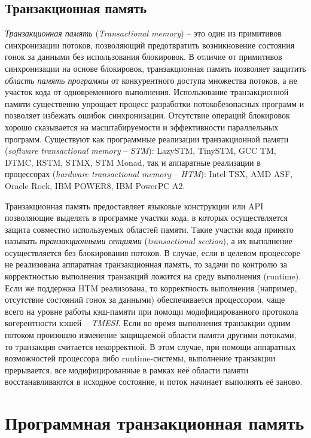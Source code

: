 \subsection{Транзакционная память}
\textit{Транзакционная память} (\textit{Transactional memory}) -- это один из примитивов синхронизации потоков, позволяющий предотвратить возникновение состояния гонок за данными без использования блокировок. В отличие от примитивов синхронизации на основе блокировок, транзакционная память позволяет защитить \textit{область память программы} от конкурентного доступа множества потоков, а не участок кода от одновременного выполнения. Использование транзакционной памяти существенно упрощает процесс разработки потокобезопасных программ и позволяет избежать ошибок синхронизации. Отсутствие операций блокировок хорошо сказывается на масштабируемости и эффективности параллельных программ. Существуют как программные реализации транзакционной памяти (\textit{software transactional memory} -- \textit{STM}): LazySTM, TinySTM, GCC TM, DTMC, RSTM, STMX, STM Monad, так и аппаратные реализации в процессорах (\textit{hardware transactional memory} -- \textit{HTM}): Intel TSX, AMD ASF, Oracle Rock, IBM POWER8, IBM PowerPC A2.

Транзакционная память предоставляет языковые конструкции или API позволяющие выделять в программе участки кода, в которых осуществляется защита совместно используемых областей памяти. Такие участки кода принято называть \textit{транзакционными секциями} (\textit{transactional section}), а их выполнение осуществляется без блокирования потоков. В случае, если в целевом процессоре не реализована аппаратная транзакционная память, то задачи по контролю за корректностью выполнения транзакций ложится на среду выполнения (runtime). Если же поддержка HTM реализована, то корректность выполнения (например, отсутствие состояний гонок за данными) обеспечивается процессором, чаще всего на уровне работы кэш-памяти при помощи модифицированного протокола когерентности кэшей -- \textit{TMESI}.  Если во время выполнения транзакции одним потоком произошло изменение защищаемой области памяти другими потоками, то транзакция считается некорректной. В этом случае, при помощи аппаратных возможностей процессора либо runtime-системы, выполнение транзакции прерывается, все модифицированные в рамках неё области памяти восстанавливаются в исходное состояние, и поток начинает выполнять её заново.

\section{Программная транзакционная память}
